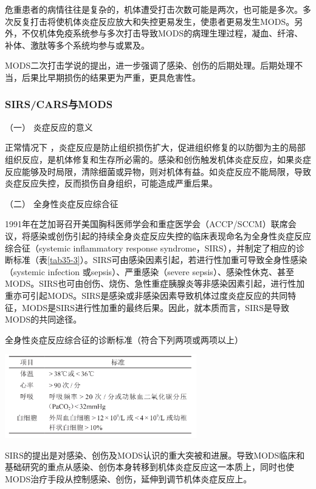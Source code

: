 危重患者的病情往往是复杂的，机体遭受打击次数可能是两次，也可能是多次。多次反复打击将使机体炎症反应放大和失控更易发生，使患者更易发生MODS。另外，不仅机体免疫系统参与多次打击导致MODS的病理生理过程，凝血、纤溶、补体、激肽等多个系统均参与或累及。

MODS二次打击学说的提出，进一步强调了感染、创伤的后期处理。后期处理不当，后果比早期损伤的结果更为严重，更具危害性。

\subsubsection{SIRS/CARS与MODS}

\hypertarget{text00093.htmlux5cux23CHP3-11-2-4-1}{}
（一） 炎症反应的意义

正常情况下
，炎症反应是防止组织损伤扩大，促进组织修复的以防御为主的局部组织反应，是机体修复和生存所必需的。感染和创伤触发机体炎症反应，如果炎症反应能够及时局限，清除细菌或异物，则对机体有益。如炎症反应不能局限，导致炎症反应失控，反而损伤自身组织，可能造成严重后果。

\hypertarget{text00093.htmlux5cux23CHP3-11-2-4-2}{}
（二） 全身性炎症反应综合征

1991年在芝加哥召开美国胸科医师学会和重症医学会（ACCP/SCCM）联席会议，将感染或创伤引起的持续全身炎症反应失控的临床表现命名为全身性炎症反应综合征（systemic
inflammatory response
syndrome，SIRS），并制定了相应的诊断标准（表\ref{tab35-3}）。SIRS可由感染因素引起，若进行性加重可导致全身性感染（systemic
infection 或sepsis）、严重感染（severe
sepsis）、感染性休克、甚至MODS。SIRS也可由创伤、烧伤、急性重症胰腺炎等非感染因素引起，进行性加重亦可引起MODS。SIRS是感染或非感染因素导致机体过度炎症反应的共同特征，MODS是SIRS进行性加重的最终后果。因此，就本质而言，SIRS是导致MODS的共同途径。

\begin{table}[htbp]
\centering
\caption{全身性炎症反应综合征的诊断标准（符合下列两项或两项以上）}
\label{tab35-3}
\includegraphics[width=3.28125in,height=1.4375in]{./images/Image00135.jpg}
\end{table}

SIRS的提出是对感染、创伤及MODS认识的重大突被和进展。导致MODS临床和基础研究的重点从感染、创伤本身转移到机体炎症反应这一本质上，同时也使MODS治疗手段从控制感染、创伤，延伸到调节机体炎症反应上。

